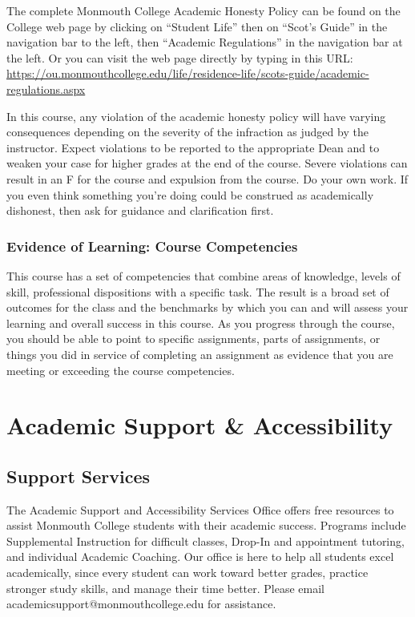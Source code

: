 \documentclass[10pt]{article}
\begin{document}
The complete Monmouth College Academic Honesty Policy can be found on the College web page by clicking on ``Student Life'' then on ``Scot’s Guide'' in the navigation bar to the left, then ``Academic Regulations'' in the navigation bar at the left.  Or you can visit the web page directly by typing in this URL: \url{https://ou.monmouthcollege.edu/life/residence-life/scots-guide/academic-regulations.aspx}

In this course, any violation of the academic honesty policy will have varying consequences depending on the severity of the infraction as judged by the instructor.  Expect violations to be reported to the appropriate Dean and to weaken your case for higher grades at the end of the course. Severe violations can result in an F for the course and expulsion from the course. Do your own work. If you even think something you're doing could be construed as academically dishonest, then ask for guidance and clarification first. 

\subsubsection*{Evidence of Learning: Course Competencies}

This course has a set of competencies that combine areas of knowledge, levels of skill, professional dispositions with a specific task. The result is a broad set of outcomes for the class and the benchmarks by which you can and will assess your learning and overall success in this course. As you progress through the course, you should be able to point to specific assignments, parts of assignments, or things you did in service of completing an assignment as evidence that you are meeting or exceeding the course competencies.


\section{Academic Support \& Accessibility}

\subsection*{Support Services}
The Academic Support and Accessibility Services Office offers free resources to assist Monmouth College students with their academic success. Programs include Supplemental Instruction for difficult classes, Drop-In and appointment tutoring, and individual Academic Coaching. Our office is here to help all students excel academically, since every student can work toward better grades, practice stronger study skills, and manage their time better. Please email academicsupport@monmouthcollege.edu for assistance.
\end{document}
